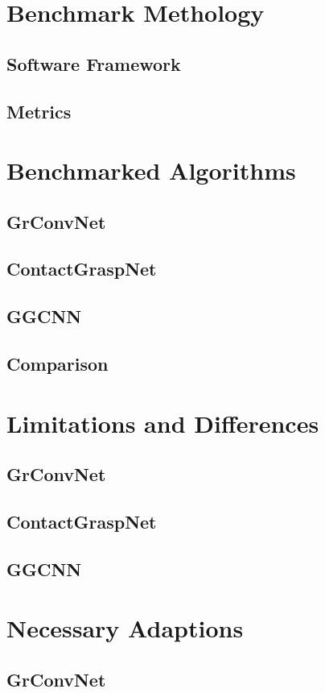 \documentclass[conference]{IEEEtran}
\begin{document}
\section{Benchmark Methology}
\subsection{Software Framework}
\subsection{Metrics}

\section{Benchmarked Algorithms}
\subsection{GrConvNet}
\subsection{ContactGraspNet}
\subsection{GGCNN}
\subsection{Comparison}

\section{Limitations and Differences}
\subsection{GrConvNet}
\subsection{ContactGraspNet}
\subsection{GGCNN}

\section{Necessary Adaptions}
\subsection{GrConvNet}
\end{document}
